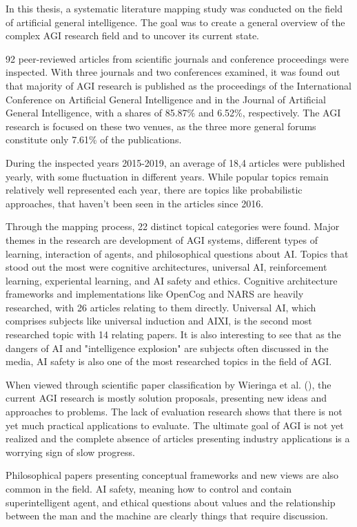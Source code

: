 \documentclass[utf8,english]{gradu3}
\begin{document}
In this thesis, a systematic literature mapping study was conducted on the field
of artificial general intelligence. The goal was to create a general overview of
the complex AGI research field and to uncover its current state. 

92 peer-reviewed articles from scientific journals and conference proceedings
were inspected. With three journals and two conferences examined, it was found
out that majority of AGI research is published as the proceedings of the
International Conference on Artificial General Intelligence and in the Journal
of Artificial General Intelligence, with a shares of 85.87\% and 6.52\%,
respectively. The AGI research is focused on these two venues, as the three more
general forums constitute only 7.61\% of the publications.

During the inspected years 2015-2019, an average of 18,4 articles were published
yearly, with some fluctuation in different years. While popular topics remain
relatively well represented each year, there are topics like probabilistic
approaches, that haven't been seen in the articles since 2016.

Through the mapping process, 22 distinct topical categories were found. Major
themes in the research are development of AGI systems, different types of
learning, interaction of agents, and philosophical questions about AI. Topics
that stood out the most were cognitive architectures, universal AI,
reinforcement learning, experiental learning, and AI safety and ethics.
Cognitive architecture frameworks and implementations like OpenCog and NARS are
heavily researched, with 26 articles relating to them directly. Universal AI,
which comprises subjects like universal induction and AIXI, is the second most
researched topic with 14 relating papers. It is also interesting to see that as
the dangers of AI and "intelligence explosion" are subjects often discussed in
the media, AI safety is also one of the most researched topics in the field of
AGI.

When viewed through scientific paper classification by Wieringa et al.
(\cite{wieringa2006}), the current AGI research is mostly solution proposals,
presenting new ideas and approaches to problems. The lack of evaluation research
shows that there is not yet much practical applications to evaluate. The
ultimate goal of AGI is not yet realized and the complete absence of articles
presenting industry applications is a worrying sign of slow progress.

Philosophical papers presenting conceptual frameworks and new views are also
common in the field. AI safety, meaning how to control and contain
superintelligent agent, and ethical questions about values and the relationship
between the man and the machine are clearly things that require discussion.
\end{document}
